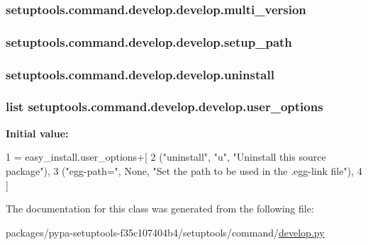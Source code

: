 \subsubsection[{multi\+\_\+version}]{\setlength{\rightskip}{0pt plus 5cm}setuptools.\+command.\+develop.\+develop.\+multi\+\_\+version}\label{classsetuptools_1_1command_1_1develop_1_1develop_ab58617aafb9fd2d0bd6f86c5b0c88b6b}
\hypertarget{classsetuptools_1_1command_1_1develop_1_1develop_aebd7d6fb89f85612802017ae8913a34f}{}
\subsubsection[{setup\+\_\+path}]{\setlength{\rightskip}{0pt plus 5cm}setuptools.\+command.\+develop.\+develop.\+setup\+\_\+path}\label{classsetuptools_1_1command_1_1develop_1_1develop_aebd7d6fb89f85612802017ae8913a34f}
\hypertarget{classsetuptools_1_1command_1_1develop_1_1develop_a40763517d7b5632fc6b6cec1838789c7}{}
\subsubsection[{uninstall}]{\setlength{\rightskip}{0pt plus 5cm}setuptools.\+command.\+develop.\+develop.\+uninstall}\label{classsetuptools_1_1command_1_1develop_1_1develop_a40763517d7b5632fc6b6cec1838789c7}
\hypertarget{classsetuptools_1_1command_1_1develop_1_1develop_a94b9fe3f4c5212fa175e8927562a77bf}{}
\subsubsection[{user\+\_\+options}]{\setlength{\rightskip}{0pt plus 5cm}list setuptools.\+command.\+develop.\+develop.\+user\+\_\+options\hspace{0.3cm}{\ttfamily [static]}}\label{classsetuptools_1_1command_1_1develop_1_1develop_a94b9fe3f4c5212fa175e8927562a77bf}
{\bfseries Initial value\+:}
\begin{DoxyCode}
1 = easy\_install.user\_options+[
2         (\textcolor{stringliteral}{"uninstall"}, \textcolor{stringliteral}{"}\textcolor{stringliteral}{u", "}Uninstall this source package"),
3         (\textcolor{stringliteral}{"egg-path="}, \textcolor{keywordtype}{None}, \textcolor{stringliteral}{"Set the path to be used in the .egg-link file"}),
4     ]
\end{DoxyCode}


The documentation for this class was generated from the following file\+:\begin{DoxyCompactItemize}
\item 
packages/pypa-\/setuptools-\/f35c107404b4/setuptools/command/\hyperlink{develop_8py}{develop.\+py}\end{DoxyCompactItemize}
